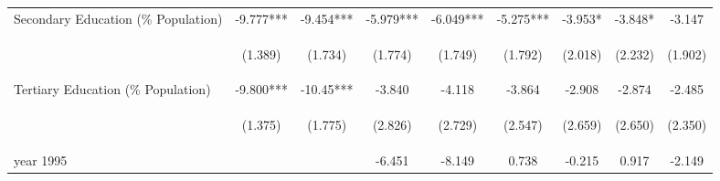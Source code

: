 \begin{landscape}
\begin{table}[htpb!]
\begin{center}
\begin{tabular}{lcccccccc}
Secondary Education (\% Population) &-9.777***&-9.454***&-5.979***&-6.049***&-5.275***&-3.953*&-3.848*&-3.147\\
&\begin{footnotesize}(1.389)\end{footnotesize}&\begin{footnotesize}(1.734)\end{footnotesize}&\begin{footnotesize}(1.774)\end{footnotesize}&\begin{footnotesize}(1.749)\end{footnotesize}&\begin{footnotesize}(1.792)\end{footnotesize}&\begin{footnotesize}(2.018)\end{footnotesize}&\begin{footnotesize}(2.232)\end{footnotesize}&\begin{footnotesize}(1.902)\end{footnotesize}\\
Tertiary Education (\% Population) &-9.800***&-10.45***&-3.840&-4.118&-3.864&-2.908&-2.874&-2.485\\
&\begin{footnotesize}(1.375)\end{footnotesize}&\begin{footnotesize}(1.775)\end{footnotesize}&\begin{footnotesize}(2.826)\end{footnotesize}&\begin{footnotesize}(2.729)\end{footnotesize}&\begin{footnotesize}(2.547)\end{footnotesize}&\begin{footnotesize}(2.659)\end{footnotesize}&\begin{footnotesize}(2.650)\end{footnotesize}&\begin{footnotesize}(2.350)\end{footnotesize}\\
year 1995&&&-6.451&-8.149&0.738&-0.215&0.917&-2.149\\

\end{tabular}
\end{center}
\end{table}
\end{landscape}
